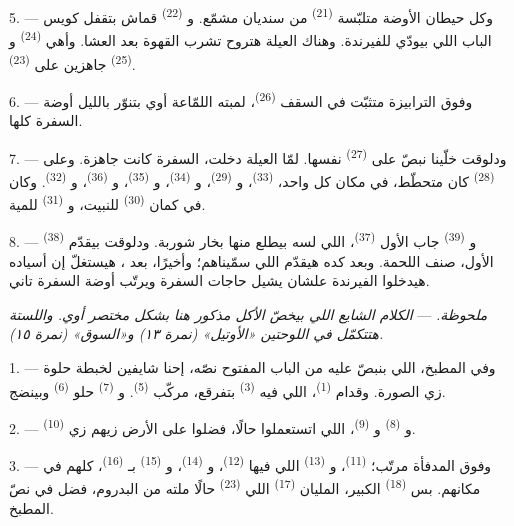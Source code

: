 5. --- وكل حيطان الأوضة متلبّسة  \textsuperscript{(21)} من سنديان
مشمّع. و \textsuperscript{(22)} قماش بتقفل كويس الباب اللي بيودّي
للفيرندة. وهناك العيلة هتروح تشرب القهوة بعد العشا. وأهي 
\textsuperscript{(24)} و \textsuperscript{(25)} جاهزين على
 \textsuperscript{(23)}.

6. --- وفوق الترابيزة متثبّت في السقف  \textsuperscript{(26)}،
لمبته اللمّاعة أوي بتنوّر بالليل أوضة السفرة كلها.

7. --- ودلوقت خلّينا نبصّ على  \textsuperscript{(27)} نفسها.
لمّا العيلة دخلت، السفرة كانت جاهزة. وعلى  \textsuperscript{(28)} كان
متحطّط، في مكان كل واحد،  \textsuperscript{(33)}، و
\textsuperscript{(29)}، و \textsuperscript{(34)}، و
\textsuperscript{(35)}، و \textsuperscript{(36)}، و
\textsuperscript{(32)}. وكان في كمان  \textsuperscript{(30)} للنبيت،
و \textsuperscript{(31)} للمية.

8. --- و \textsuperscript{(39)} جاب الأول 
\textsuperscript{(37)}، اللي لسه بيطلع منها بخار شوربة. ودلوقت بيقدّم 
\textsuperscript{(38)} الأول، صنف اللحمة. وبعد كده هيقدّم اللي سمّيناهم؛ وأخيرًا،
بعد ، هيستغلّ إن أسياده هيدخلوا الفيرندة علشان يشيل
حاجات السفرة ويرتّب أوضة السفرة تاني.

\textit{ملحوظة.} --- \textit{الكلام الشايع اللي بيخصّ الأكل مذكور هنا بشكل
مختصر أوي. واللستة هتتكمّل في اللوحتين «الأوتيل» (نمرة ١٣) و«السوق» (نمرة
١٥).}

\VUsaut{4.6mm}
\VUsaut{3.0mm}

1. --- وفي المطبخ، اللي بنبصّ عليه من الباب المفتوح نصّه، إحنا شايفين لخبطة
حلوة زي الصورة. وقدام  \textsuperscript{(1)}، اللي فيه 
\textsuperscript{(3)} بتفرقع، مركّب  \textsuperscript{(5)}.
و \textsuperscript{(7)} حلو  \textsuperscript{(6)} وبينضج.

2. --- و \textsuperscript{(8)} و
\textsuperscript{(9)}، اللي اتستعملوا حالًا، فضلوا على الأرض زيهم زي
 \textsuperscript{(10)}.

3. --- وفوق المدفأة مرتّب؛  \textsuperscript{(11)}، و \textsuperscript{(13)} اللي فيها  \textsuperscript{(12)}،
و \textsuperscript{(14)}، و \textsuperscript{(15)}
بـ \textsuperscript{(16)}، كلهم في مكانهم. بس 
\textsuperscript{(18)} الكبير، المليان  \textsuperscript{(17)} اللي
 \textsuperscript{(23)} حالًا ملته من البدروم، فضل في نصّ المطبخ.

